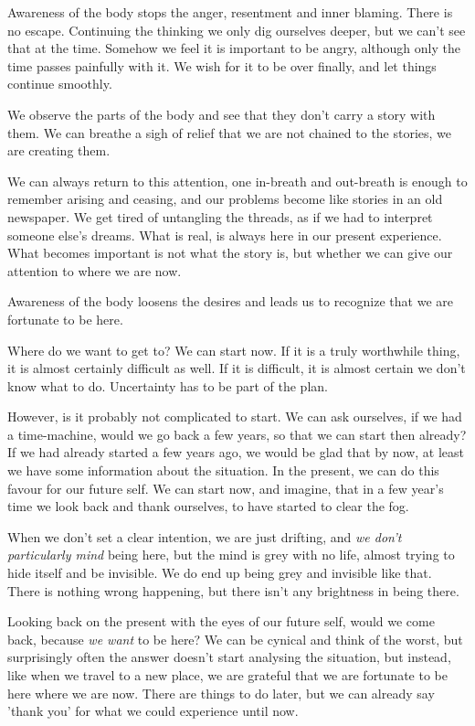 Awareness of the body stops the anger, resentment and inner blaming.
There is no escape. Continuing the thinking we only dig ourselves
deeper, but we can't see that at the time. Somehow we feel it is
important to be angry, although only the time passes painfully with it.
We wish for it to be over finally, and let things continue smoothly.

We observe the parts of the body and see that they don't carry a story
with them. We can breathe a sigh of relief that we are not chained to
the stories, we are creating them.

We can always return to this attention, one in-breath and out-breath is
enough to remember arising and ceasing, and our problems become like
stories in an old newspaper. We get tired of untangling the threads, as
if we had to interpret someone else's dreams. What is real, is always
here in our present experience. What becomes important is not what the
story is, but whether we can give our attention to where we are now.

Awareness of the body loosens the desires and leads us to recognize that
we are fortunate to be here.

Where do we want to get to? We can start now. If it is a truly
worthwhile thing, it is almost certainly difficult as well. If it is
difficult, it is almost certain we don't know what to do. Uncertainty
has to be part of the plan.

However, is it probably not complicated to start. We can ask ourselves,
if we had a time-machine, would we go back a few years, so that we can
start then already? If we had already started a few years ago, we would
be glad that by now, at least we have some information about the
situation. In the present, we can do this favour for our future self. We
can start now, and imagine, that in a few year's time we look back and
thank ourselves, to have started to clear the fog.

When we don't set a clear intention, we are just drifting, and \emph{we
don't particularly mind} being here, but the mind is grey with no life,
almost trying to hide itself and be invisible. We do end up being grey
and invisible like that. There is nothing wrong happening, but there
isn't any brightness in being there.

Looking back on the present with the eyes of our future self, would we
come back, because \emph{we want} to be here? We can be cynical and
think of the worst, but surprisingly often the answer doesn't start
analysing the situation, but instead, like when we travel to a new
place, we are grateful that we are fortunate to be here where we are
now. There are things to do later, but we can already say 'thank you'
for what we could experience until now.

